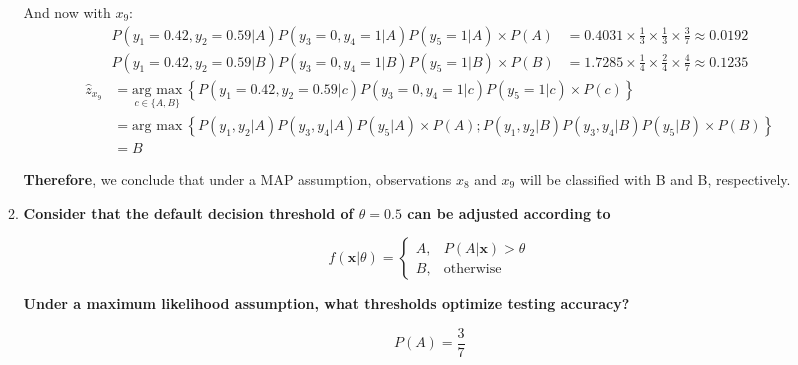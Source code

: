 \documentclass[12pt]{article}
\begin{document}
\begin{enumerate}[leftmargin=\labelsep]
\begin{enumerate}
          And now with $x_9$:
          $$
              \begin{aligned}
                  P(y_1 = 0.42, y_2 = 0.59 | A) P(y_3 = 0, y_4 = 1 | A) P(y_5 = 1 | A) \times P(A) & = 0.4031 \times \frac{1}{3} \times \frac{1}{3} \times \frac{3}{7} \approx 0.0192 \\
                  P(y_1 = 0.42, y_2 = 0.59 | B) P(y_3 = 0, y_4 = 1 | B) P(y_5 = 1 | B) \times P(B) & = 1.7285 \times \frac{1}{4} \times \frac{2}{4} \times \frac{4}{7} \approx 0.1235
              \end{aligned}
          $$
          $$
              \begin{aligned}
                  \hat{z}_{x_9} & = \underset{c \in \{A, B\}}{\text{arg max}} \medspace \left\{P(y_1 = 0.42, y_2 = 0.59 | c) P(y_3 = 0, y_4 = 1 | c) P(y_5 = 1 | c) \times P(c)\right\}  \\
                          & = \text{arg max} \medspace \left\{P(y_1, y_2 | A) P(y_3, y_4 | A) P(y_5 | A) \times P(A); P(y_1, y_2 | B) P(y_3, y_4 | B) P(y_5 | B) \times P(B)\right\} \\
                          & = B
              \end{aligned}
          $$

          \textbf{Therefore}, we conclude that under a MAP assumption, observations $x_8$ and $x_9$ will be classified with B and B, respectively.

          \item \textbf{Consider that the default decision threshold of $\theta = 0.5$ can be adjusted according to}

                \[
                        f(\textbf{x}|\theta)=
                    \begin{cases}
                        A,& P(A|\textbf{x}) > \theta\\
                        B,& \text{otherwise}
                    \end{cases}
                \]

                \textbf{Under a maximum likelihood assumption, what thresholds optimize testing accuracy?}

          \vskip 0.3cm
          

          \begin{equation*}
            P(A) = \frac{3}{7}
          \end{equation*}
        

\end{enumerate}
\end{enumerate}
\end{document}
